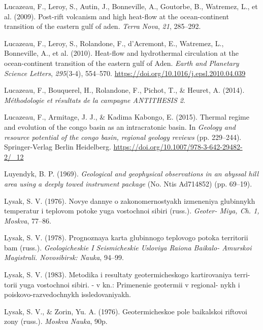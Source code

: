 \begin{CSLReferences}{1}{1}
\leavevmode{}%
Lucazeau, F., Leroy, S., Autin, J., Bonneville, A., Goutorbe, B., Watremez, L., et al. (2009). Post-rift volcanism and high heat-flow at the ocean-continent transition of the eastern gulf of aden. \emph{Terra Nova}, \emph{21}, 285--292.

\leavevmode{}%
Lucazeau, F., Leroy, S., Rolandone, F., d'Acremont, E., Watremez, L., Bonneville, A., et al. (2010). Heat-flow and hydrothermal circulation at the ocean-continent transition of the eastern {gulf of Aden}. \emph{Earth and Planetary Science Letters}, \emph{295}(3-4), 554--570. \url{https://doi.org/10.1016/j.epsl.2010.04.039}

\leavevmode{}%
Lucazeau, F., Bouquerel, H., Rolandone, F., Pichot, T., \& Heuret, A. (2014). \emph{Méthodologie et résultats de la campagne ANTITHESIS 2}.

\leavevmode{}%
Lucazeau, F., Armitage, J. J., \& Kadima Kabongo, E. (2015). Thermal regime and evolution of the congo basin as an intracratonic basin. In \emph{Geology and resource potential of the congo basin, regional geology reviews} (pp. 229--244). Springer-Verlag Berlin Heidelberg. \url{https://doi.org/10.1007/978-3-642-29482-2/_12}

\leavevmode{}%
Luyendyk, B. P. (1969). \emph{Geological and geophysical observations in an abyssal hill area using a deeply towed instrument package} (No. Ntis Ad714852) (pp. 69--19).

\leavevmode{}%
Lysak, S. V. (1976). Novye dannye o zakonomernostyakh izmeneniya glubinnykh temperatur i teplovom potoke yuga vostochnoi sibiri (russ.). \emph{Geoter- Miya, Ch. 1, Moskva}, 77--86.

\leavevmode{}%
Lysak, S. V. (1978). Prognoznaya karta glubinnogo teplovogo potoka territorii bam (russ.). \emph{Geologicheskie I Seismicheskie Usloviya Raiona Baikalo- Amurskoi Magistrali. Novosibirsk: Nauka}, 94--99.

\leavevmode{}%
Lysak, S. V. (1983). Metodika i resultaty geotermicheskogo kartirovaniya terri- torii yuga vostochnoi sibiri. - v kn.: Primenenie geotermii v regional- nykh i poiskovo-razvedochnykh issledovaniyakh.

\leavevmode{}%
Lysak, S. V., \& Zorin, Yu. A. (1976). Geotermicheskoe pole baikalskoi riftovoi zony (russ.). \emph{Moskva Nauka}, 90p.


\end{CSLReferences}
